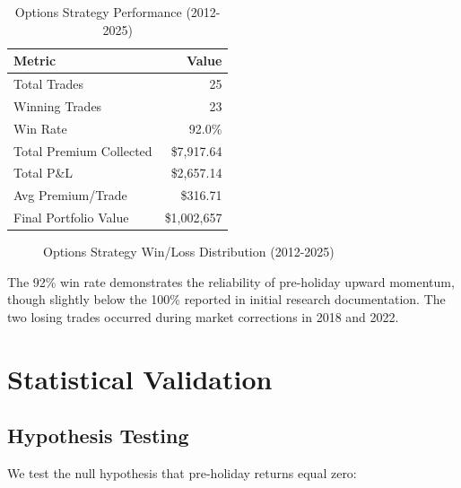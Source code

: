 \documentclass[twocolumn,ieee]{arithmaxresearch}
\begin{document}
\begin{table}[h]
\centering
\caption{Options Strategy Performance (2012-2025)}
\label{tab:options}
\begin{tabular}{lr}
\toprule
\textbf{Metric} & \textbf{Value} \\
\midrule
Total Trades & 25 \\
Winning Trades & 23 \\
Win Rate & 92.0\% \\
Total Premium Collected & \$7,917.64 \\
Total P\&L & \$2,657.14 \\
Avg Premium/Trade & \$316.71 \\
Final Portfolio Value & \$1,002,657 \\
\bottomrule
\end{tabular}
\end{table}

\begin{figure}[!t]
\centering
{}
\caption{Options Strategy Win/Loss Distribution (2012-2025)}
\label{fig:options_winrate}
\end{figure}

The 92\% win rate demonstrates the reliability of pre-holiday upward momentum, though slightly below the 100\% reported in initial research documentation. The two losing trades occurred during market corrections in 2018 and 2022.

\section{Statistical Validation}

\subsection{Hypothesis Testing}

We test the null hypothesis that pre-holiday returns equal zero:
\end{document}
